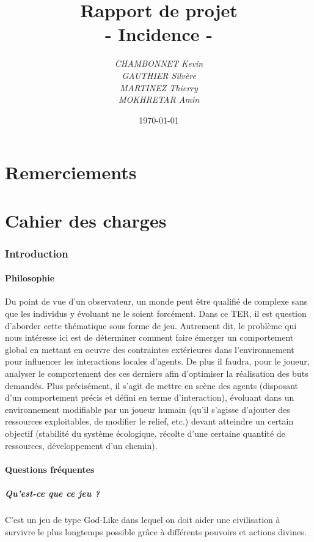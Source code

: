 \documentclass[a4paper]{article}
\title{\textbf{Rapport de projet}\\- \Huge{Incidence} -}
\author{\emph{CHAMBONNET Kevin}\\\emph{GAUTHIER Silvère}\\\emph{MARTINEZ Thierry}\\\emph{MOKHRETAR Amin}}
\date{\today}
\newcommand{\alinea}{\hspace*{0.5cm}}
\begin{document}
  \maketitle
  \newpage
  \tableofcontents
  
  \newpage
  \part{Remerciements}

  \newpage
  \part{Cahier des charges}
  
    \section{Introduction}
      \subsection{Philosophie}
        \alinea Du point de vue d’un observateur, un monde peut être qualifié de complexe sans que les individus y évoluant ne le soient forcément. Dans ce TER, il est question d’aborder cette thématique sous forme de jeu. Autrement dit, le problème qui nous intéresse ici est de déterminer comment faire émerger un comportement global en mettant en oeuvre des contraintes extérieures dans l’environnement pour influencer les interactions locales d’agents. De plus il faudra, pour le joueur, analyser le comportement des ces derniers afin d’optimiser la réalisation des buts demandés. Plus précisément, il s’agit de mettre en scène des agents (disposant d’un comportement précis et défini en terme d’interaction), évoluant dans un environnement modifiable par un joueur humain (qu’il s’agisse d’ajouter des ressources exploitables, de modifier le relief, etc.) devant atteindre un certain objectif (stabilité du système écologique, récolte d’une certaine quantité de ressources, développement d’un chemin).

      \subsection{Questions fréquentes}
        \subsubsection{Qu'est-ce que ce jeu ?}
          \alinea C'est un jeu de type God-Like dans lequel on doit aider une civilisation à survivre le plus longtemps possible grâce à différents pouvoirs et actions divines.
			
\end{document}
